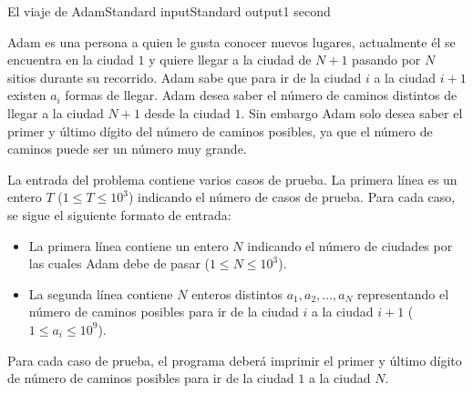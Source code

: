 \begin{problem}{El viaje de Adam}{Standard input}{Standard output}{1 second}{}


Adam es una persona a quien le gusta conocer nuevos lugares, actualmente él se encuentra en la ciudad $1$ y quiere llegar a la ciudad de $N + 1$ pasando por $N$ sitios durante su recorrido. 
Adam sabe que para ir de la ciudad $i$  a la ciudad $i + 1$ existen $a_i$ formas de llegar. Adam desea saber el número de caminos distintos de llegar a la ciudad $N + 1$ desde la ciudad $1$. 
Sin embargo Adam solo desea saber el primer y último dígito del número de caminos posibles, ya que el número de caminos puede ser un número muy grande.

\InputFile

La entrada del problema contiene varios casos de prueba. La primera línea es un entero $T$ ($1 \leq T \leq 10^3$) indicando el número de casos de prueba. Para cada caso, se sigue el siguiente formato de entrada:

\begin{itemize}
\item La primera línea contiene un entero $N$ indicando el número de ciudades por las cuales Adam debe de pasar ($1 \leq N \leq 10^3$).
\item La segunda línea contiene $N$ enteros distintos $a_1, a_2, \dots, a_N$ representando el número de caminos posibles para ir de la ciudad $i$ a la ciudad $i+1$ ($1 \leq a_i \leq 10^9$).
\end{itemize}

\OutputFile
Para cada caso de prueba, el programa deber\'a imprimir el primer y último dígito de número de caminos posibles para ir de la ciudad $1$ a la ciudad $N$.

\Example

\begin{example}
\end{example}

\end{problem}
